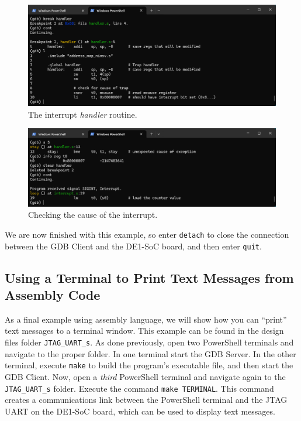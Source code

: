\documentclass[11pt, twoside, pdftex]{article}
\begin{document}
\begin{figure}[h]
    \begin{center}
        \includegraphics[scale=.6]{figures/interrupt_s4.png}
        \caption{The interrupt {\it handler} routine.}
        \label{fig:interrupt_s4}
    \end{center}
\end{figure}

\begin{figure}[h]
    \begin{center}
        \includegraphics[scale=.6]{figures/interrupt_s5.png}
        \caption{Checking the cause of the interrupt.}
        \label{fig:interrupt_s5}
    \end{center}
\end{figure}

We are now finished with this example, so enter \texttt{detach} to close the connection between 
the GDB Client and the DE1-SoC board, and then enter \texttt{quit}.

\subsection{Using a Terminal to Print Text Messages from Assembly Code}

As a final example using assembly language, we will show how you can ``print'' text messages 
to a terminal window.  This example can be found in the design files folder 
\texttt{JTAG\_UART\_s}. As done previously, open two PowerShell terminals and navigate to
the proper folder. In one terminal
start the GDB Server. In the other terminal, execute \texttt{make} to build the program's
executable file, and then start the GDB Client. Now, open a {\it third} PowerShell
terminal and navigate again to the \texttt{JTAG\_UART\_s} folder. Execute the command 
\texttt{make TERMINAL}. This command creates a communications link between the PowerShell
terminal and the JTAG UART on the DE1-SoC board, which can be used to display text
messages. 
\end{document}
